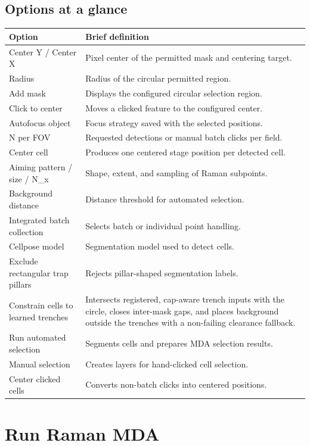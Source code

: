 \documentclass[11pt,oneside]{report}
\begin{document}
\section*{Options at a glance}
\begin{longtable}{@{}p{}p{}@{}}
\toprule\textbf{Option} & \textbf{Brief definition}\\\midrule
Center Y / Center X & Pixel center of the permitted mask and centering target.\\
Radius & Radius of the circular permitted region.\\
Add mask & Displays the configured circular selection region.\\
Click to center & Moves a clicked feature to the configured center.\\
Autofocus object & Focus strategy saved with the selected positions.\\
N per FOV & Requested detections or manual batch clicks per field.\\
Center cell & Produces one centered stage position per detected cell.\\
Aiming pattern / size / N\_x & Shape, extent, and sampling of Raman subpoints.\\
Background distance & Distance threshold for automated selection.\\
Integrated batch collection & Selects batch or individual point handling.\\
Cellpose model & Segmentation model used to detect cells.\\
Exclude rectangular trap pillars & Rejects pillar-shaped segmentation labels.\\
Constrain cells to learned trenches & Intersects registered, cap-aware trench
inputs with the circle, closes inter-mask gaps, and places background outside
the trenches with a non-failing clearance fallback.\\
Run automated selection & Segments cells and prepares MDA selection results.\\
Manual selection & Creates layers for hand-clicked cell selection.\\
Center clicked cells & Converts non-batch clicks into centered positions.\\
\bottomrule\end{longtable}

\chapter{Run Raman MDA}
\end{document}
